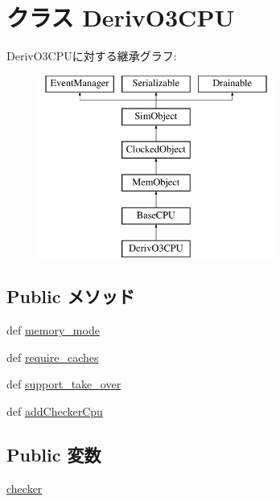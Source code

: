 \hypertarget{classO3CPU_1_1DerivO3CPU}{
\section{クラス DerivO3CPU}
\label{classO3CPU_1_1DerivO3CPU}
}
DerivO3CPUに対する継承グラフ:\begin{figure}[H]
\begin{center}
\leavevmode
\includegraphics[height=6cm]{classO3CPU_1_1DerivO3CPU}
\end{center}
\end{figure}
\subsection*{Public メソッド}
\begin{DoxyCompactItemize}
\item 
def \hyperlink{classO3CPU_1_1DerivO3CPU_a53d73a2f804df6a1dcabb22052d09773}{memory\_\-mode}
\item 
def \hyperlink{classO3CPU_1_1DerivO3CPU_afcb2c5440cbf782e304bdb958eadf744}{require\_\-caches}
\item 
def \hyperlink{classO3CPU_1_1DerivO3CPU_aa201537acf29724056129b8efad43371}{support\_\-take\_\-over}
\item 
def \hyperlink{classO3CPU_1_1DerivO3CPU_a97c178b398a7fc7e24932f2058d14381}{addCheckerCpu}
\end{DoxyCompactItemize}
\subsection*{Public 変数}
\begin{DoxyCompactItemize}
\item 
\hyperlink{classO3CPU_1_1DerivO3CPU_ad4f09c6c6f92935f2d917a5b0ba77cb0}{checker}
\end{DoxyCompactItemize}
